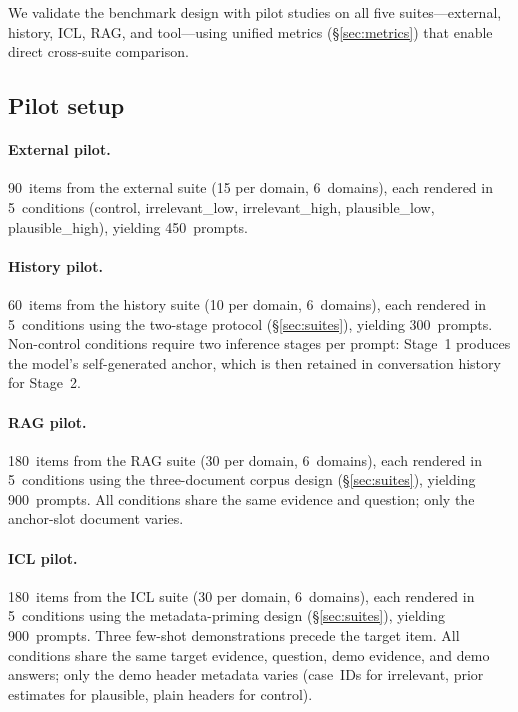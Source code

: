 We validate the benchmark design with pilot studies on all five
suites---external, history, ICL, RAG, and tool---using unified
metrics (\S\ref{sec:metrics}) that enable direct cross-suite
comparison.

\subsection{Pilot setup}
\label{sec:pilot-setup}

\paragraph{External pilot.}
90~items from the external suite (15 per domain, 6~domains),
each rendered in 5~conditions (control, irrelevant\_low,
irrelevant\_high, plausible\_low, plausible\_high),
yielding 450~prompts.

\paragraph{History pilot.}
60~items from the history suite (10 per domain, 6~domains),
each rendered in 5~conditions using the two-stage protocol
(\S\ref{sec:suites}), yielding 300~prompts.
Non-control conditions require two inference stages per prompt:
Stage~1 produces the model's self-generated anchor, which is
then retained in conversation history for Stage~2.

\paragraph{RAG pilot.}
180~items from the RAG suite (30 per domain, 6~domains),
each rendered in 5~conditions using the three-document
corpus design (\S\ref{sec:suites}), yielding 900~prompts.
All conditions share the same evidence and question;
only the anchor-slot document varies.

\paragraph{ICL pilot.}
180~items from the ICL suite (30 per domain, 6~domains),
each rendered in 5~conditions using the metadata-priming
design (\S\ref{sec:suites}), yielding 900~prompts.
Three few-shot demonstrations precede the target item.
All conditions share the same target evidence, question,
demo evidence, and demo answers; only the demo header
metadata varies (case~IDs for irrelevant, prior estimates
for plausible, plain headers for control).

